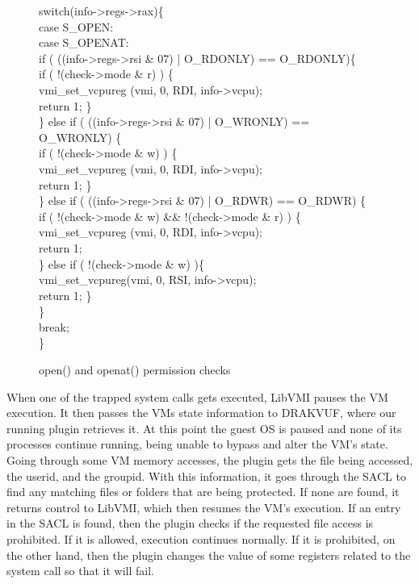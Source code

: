 \begin{figure}[ht!]
\footnotesize {
	{\selectfont 
switch(info->regs->rax)\{\\
\tab case S\_OPEN:\\
\tab case S\_OPENAT:\\
\tab if ( ((info->regs->rsi \& 07) | O\_RDONLY) == O\_RDONLY)\{\\
\tab \tab if ( !(check->mode \& r) ) \{\\
\tab \tab \tab vmi\_set\_vcpureg (vmi, 0, RDI, info->vcpu);\\
\tab \tab \tab return 1; \}\\
\tab \} else if ( ((info->regs->rsi \& 07) | O\_WRONLY) == O\_WRONLY) \{\\
\tab \tab if ( !(check->mode \& w) ) \{\\
\tab \tab \tab vmi\_set\_vcpureg (vmi, 0, RDI, info->vcpu);\\
\tab \tab \tab return 1; \}\\
\tab \} else if ( ((info->regs->rsi \& 07) | O\_RDWR) == O\_RDWR) \{\\
\tab \tab if ( !(check->mode \& w) \&\& !(check->mode \& r) ) \{\\
\tab \tab \tab vmi\_set\_vcpureg (vmi, 0, RDI, info->vcpu);\\
\tab \tab \tab return 1;\\
\tab \tab \} else if ( !(check->mode \& w) )\{\\
\tab \tab \tab vmi\_set\_vcpureg(vmi, 0, RSI, info->vcpu);\\
\tab \tab \tab return 1; \}\\
\tab \}\\
\tab break;\\
\}\\
}}
	\caption{open() and openat() permission checks}
	\label{fig:open}
\end{figure}



\par When one of the trapped system calls gets executed, LibVMI pauses the \ac{VM} execution. It then passes the \ac{VM}s state information to DRAKVUF, where our running plugin retrieves it. At this point the guest \ac{OS} is paused and none of its processes continue running, being unable to bypass and alter the \ac{VM}'s state. Going through some \ac{VM} memory accesses, the plugin gets the file being accessed, the userid, and the groupid. With this information, it goes through the \ac{SACL} to find any matching files or folders that are being protected. If none are found, it returns control to LibVMI, which then resumes the \ac{VM}'s execution. If an entry in the \ac{SACL} is found, then the plugin checks if the requested file access is prohibited. If it is allowed, execution continues normally. If it is prohibited, on the other hand, then the plugin changes the value of some registers related to the system call so that it will fail.







